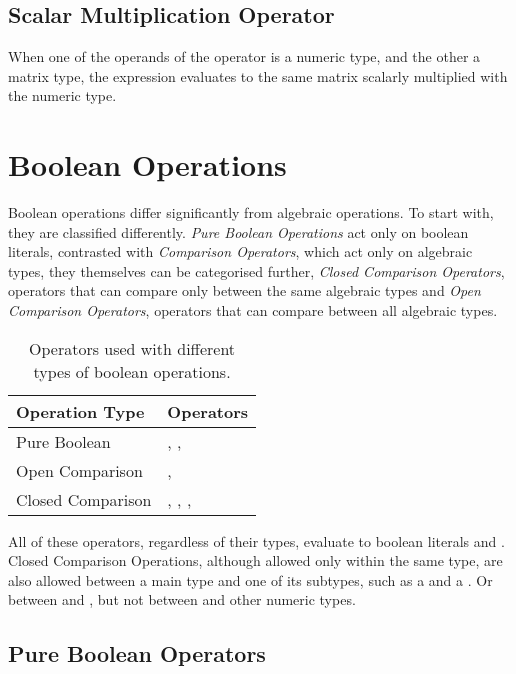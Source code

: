\documentclass[11pt,a4paper]{book}
\begin{document}
\subsection{Scalar Multiplication Operator \code{*}}

When one of the operands of the operator \code{*} is a numeric type, and the other a matrix type, the expression evaluates to the same matrix scalarly multiplied with the numeric type.

\section{Boolean Operations}

Boolean operations differ significantly from algebraic operations. To start with, they are classified differently. \textit{Pure Boolean Operations} act only on boolean literals, contrasted with \textit{Comparison Operators}, which act only on algebraic types, they themselves can be categorised further, \textit{Closed Comparison Operators}, operators that can compare only between the same algebraic types and \textit{Open Comparison Operators}, operators that can compare between all algebraic types.

\begin{table}[htbb]
\label{tab:booleanoperators}
\begin{tabular}{ll}
\toprule
Operation Type & Operators \\
\midrule
Pure Boolean & \code{\&}, \code{|}, \code{\textbackslash} \\
Open Comparison & \code{=}, \code{\textbackslash =} \\
Closed Comparison & \code{<}, \code{>}, \code{<=}, \code{>=} \\
\bottomrule
\end{tabular}
\caption{Operators used with different types of boolean operations.}
\end{table}

All of these operators, regardless of their types, evaluate to boolean literals  and . Closed Comparison Operations, although allowed only within the same type, are also allowed between a main type and one of its subtypes, such as a  and a . Or between  and , but not between  and other numeric types. \\

\subsection{Pure Boolean Operators}
\end{document}
